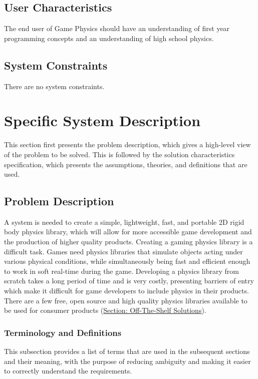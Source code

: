 \documentclass[12pt]{article}
\begin{document}
\subsection{User Characteristics}
\label{Sec:UserChars}
The end user of Game Physics should have an understanding of first year programming concepts and an understanding of high school physics.

\subsection{System Constraints}
\label{Sec:SysConstraints}
There are no system constraints.

\section{Specific System Description}
\label{Sec:SpecSystDesc}
This section first presents the problem description, which gives a high-level view of the problem to be solved. This is followed by the solution characteristics specification, which presents the assumptions, theories, and definitions that are used.

\subsection{Problem Description}
\label{Sec:ProbDesc}
A system is needed to create a simple, lightweight, fast, and portable 2D rigid body physics library, which will allow for more accessible game development and the production of higher quality products. Creating a gaming physics library is a difficult task. Games need physics libraries that simulate objects acting under various physical conditions, while simultaneously being fast and efficient enough to work in soft real-time during the game. Developing a physics library from scratch takes a long period of time and is very costly, presenting barriers of entry which make it difficult for game developers to include physics in their products. There are a few free, open source and high quality physics libraries available to be used for consumer products (\hyperref[Sec:offShelfSolns]{Section: Off-The-Shelf Solutions}).

\subsubsection{Terminology and Definitions}
\label{Sec:TermDefs}
This subsection provides a list of terms that are used in the subsequent sections and their meaning, with the purpose of reducing ambiguity and making it easier to correctly understand the requirements.
\end{document}
